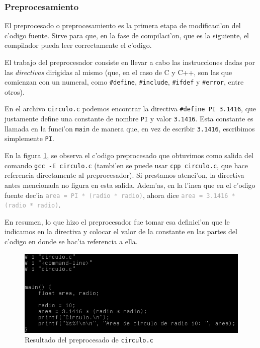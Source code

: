 \documentclass[11pt]{article}
\begin{document}
	\subsubsection{Preprocesamiento}
		El preprocesado o preprocesamiento es la primera etapa de modificaci'on del c'odigo fuente. Sirve para que, en la fase de compilaci'on, que es la siguiente, el compilador pueda leer correctamente el c'odigo. 
    
    	El trabajo del preprocesador consiste en llevar a cabo las instrucciones dadas por las \textit{directivas} dirigidas al mismo (que, en el caso de C y C++, son las que comienzan con un numeral, como \texttt{\textcolor{fuchsia-vim}{\#define}}, \texttt{\textcolor{fuchsia-vim}{\#include}}, \texttt{\textcolor{fuchsia-vim}{\#ifdef}} y \texttt{\textcolor{fuchsia-vim}{\#error}}, entre otros).

   		En el archivo \texttt{circulo.c} podemos encontrar la directiva  \texttt{\textcolor{fuchsia-vim}{\#define PI} \textcolor{orange-desert-vim}{3.1416}}, que justamente define una constante de nombre \texttt{\textcolor{fuchsia-vim}{PI}} y valor \texttt{\textcolor{orange-desert-vim}{3.1416}}. Esta constante es llamada en la funci'on \texttt{main} de manera que, en vez de escribir  \texttt{\textcolor{orange-desert-vim}{3.1416}}, escribimos simplemente  \texttt{\textcolor{fuchsia-vim}{PI}}.

    	En la figura \ref{fig:preproc_circ},
   		se observa el c'odigo preprocesado que obtuvimos como salida del comando \texttt{gcc -E circulo.c} (tambi'en se puede usar \texttt{cpp circulo.c}, que hace referencia directamente al preprocesador). Si prestamos atenci'on, la directiva antes mencionada no figura en esta salida. Adem'as, en la l'inea que en el c'odigo fuente dec'ia \texttt{\textcolor{darkgray}{area = PI * (radio * radio)}}, ahora dice \texttt{\textcolor{darkgray}{area = \textcolor{orange-desert-vim}{3.1416} * (radio * radio)}}. 

   		En resumen, lo que hizo el preprocesador fue tomar esa definici'on que le indicamos en la directiva y colocar el valor de la constante en las partes del c'odigo en donde se hac'ia referencia a ella.
   		
   		\begin{figure}[H]
   			\centering
			\includegraphics[width=.9\linewidth]{Images/Seccion 1/preprocesado_circulo}
   			\caption{Resultado del preprocesado de \texttt{circulo.c}}
   			\label{fig:preproc_circ}
   		\end{figure}
\end{document}
